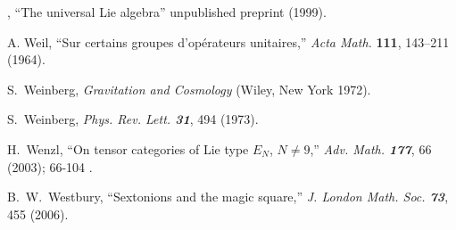 ,
    ``The universal Lie algebra''
     unpublished preprint (1999).



 A. Weil,
   ``Sur certains groupes d'op\'erateurs unitaires,''
   {\em Acta Math.} {\bf 111}, 143--211 (1964).

 S.~Weinberg,
    {\em Gravitation and Cosmology}
    (Wiley, New York 1972).

 S.~Weinberg,
    {\em Phys. Rev. Lett.  \bf 31}, 494 (1973).


 H.~Wenzl, %
    ``On tensor categories of Lie type $E_N$, $N \ne 9$,''
    {\em Adv. Math. \bf  177}, 66 (2003); 66-104
    .




 B.~W.~Westbury,
        ``Sextonions and the magic square,''
         {\em J. London Math. Soc. \bf 73}, 455 (2006). %


